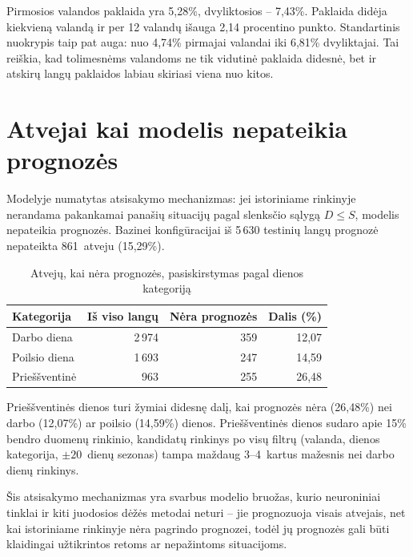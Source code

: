 \documentclass[]{VUMIFTemplateClass}
\begin{document}
    Pirmosios valandos paklaida yra 5,28\%, dvyliktosios -- 7,43\%.
    Paklaida didėja kiekvieną valandą ir per 12 valandų išauga 2,14 procentino punkto.
    Standartinis nuokrypis taip pat auga: nuo 4,74\% pirmajai valandai iki 6,81\% dvyliktajai.
    Tai reiškia, kad tolimesnėms valandoms ne tik vidutinė paklaida didesnė, bet ir atskirų langų paklaidos labiau skiriasi viena nuo kitos.


    \section{Atvejai kai modelis nepateikia prognozės}

    Modelyje numatytas atsisakymo mechanizmas: jei istoriniame rinkinyje nerandama pakankamai panašių situacijų pagal slenksčio sąlygą $D \le S$, modelis nepateikia prognozės.
    Bazinei konfigūracijai iš 5\,630 testinių langų prognozė nepateikta 861~atveju (15,29\%).

    \begin{table}[H]
        \centering
        \caption{Atvejų, kai nėra prognozės, pasiskirstymas pagal dienos kategoriją}
        \small
        \setlength{\tabcolsep}{10pt}
        \begin{tabular}{|l|r|r|r|}
            \hline
            \textbf{Kategorija} & \textbf{Iš viso langų} & \textbf{Nėra prognozės} & \textbf{Dalis (\%)} \\
            \hline
            Darbo diena         & 2\,974                 & 359                     & 12{,}07             \\
            Poilsio diena       & 1\,693                 & 247                     & 14{,}59             \\
            Prieššventinė       & 963                    & 255                     & 26{,}48             \\
            \hline
        \end{tabular}
        \label{tab:no_pred_cat}
    \end{table}

    Prieššventinės dienos turi žymiai didesnę dalį, kai prognozės nėra (26,48\%) nei darbo (12,07\%) ar poilsio (14,59\%) dienos.
    Prieššventinės dienos sudaro apie 15\% bendro duomenų rinkinio, kandidatų rinkinys po visų filtrų (valanda, dienos kategorija, $\pm 20$~dienų sezonas) tampa maždaug 3--4~kartus mažesnis nei darbo dienų rinkinys.

    Šis atsisakymo mechanizmas yra svarbus modelio bruožas, kurio neuroniniai tinklai ir kiti juodosios dėžės metodai neturi -- jie prognozuoja visais atvejais, net kai istoriniame rinkinyje nėra pagrindo prognozei, todėl jų prognozės gali būti klaidingai užtikrintos retoms ar nepažintoms situacijoms.
\end{document}
